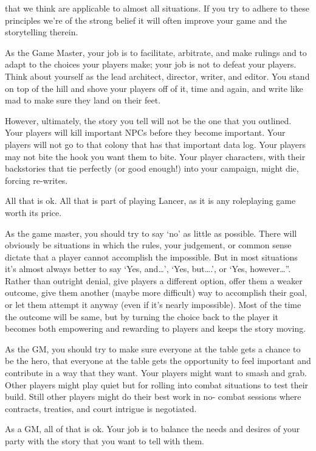 that we think are applicable to almost all situations. If you try to adhere to these principles we’re
of the strong belief it will often improve your game and the storytelling therein.


As the Game Master, your job is to facilitate, arbitrate, and make rulings and to adapt to the
choices your players make; your job is not to defeat your players. Think about yourself as the
lead architect, director, writer, and editor. You stand on top of the hill and shove your players off
of it, time and again, and write like mad to make sure they land on their feet.


However, ultimately, the story you tell will not be the one that you outlined. Your players will
kill important NPCs before they become important. Your players will not go to that colony that
has that important data log. Your players may not bite the hook you want them to bite. Your
player characters, with their backstories that tie perfectly (or good enough!) into your campaign,
might die, forcing re-writes.


All that is ok. All that is part of playing Lancer, as it is any roleplaying game worth its price.


As the game master, you should try to say ‘no’ as little as possible. There will obviously be
situations in which the rules, your judgement, or common sense dictate that a player cannot
accomplish the impossible. But in most situations it’s almost always better to say ‘Yes, and…’,
‘Yes, but….’, or ‘Yes, however…”. Rather than outright denial, give players a different option,
offer them a weaker outcome, give them another (maybe more difficult) way to accomplish their
goal, or let them attempt it anyway (even if it’s nearly impossible). Most of the time the outcome
will be same, but by turning the choice back to the player it becomes both empowering and
rewarding to players and keeps the story moving.


As the GM, you should try to make sure everyone at the table gets a chance to be the hero,
that everyone at the table gets the opportunity to feel important and contribute in a way that they
want. Your players might want to smash and grab. Other players might play quiet but for rolling
into combat situations to test their build. Still other players might do their best work in no-
combat sessions where contracts, treaties, and court intrigue is negotiated.


As a GM, all of that is ok. Your job is to balance the needs and desires of your party with the
story that you want to tell with them.


